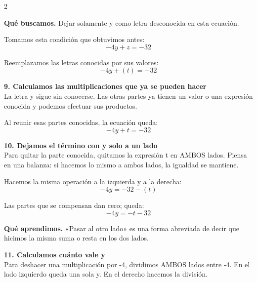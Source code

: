\documentclass[11pt,a4paper,landscape]{article}
\begin{document}
\begin{multicols*}{2}
\begin{minipage}{\linewidth}
\par\smallskip\textbf{Qué buscamos.} Dejar solamente y como letra desconocida en esta ecuación.
\par\smallskip Tomamos esta condición que obtuvimos antes:
\[-4y + z = -32\]
\par\smallskip Reemplazamos las letras conocidas por sus valores:
\[-4y + \left(t\right)=-32\]
\end{minipage}\par\medskip
\noindent\begin{minipage}{\linewidth}\textbf{9. Calculamos las multiplicaciones que ya se pueden hacer}\\[2pt]La letra y sigue sin conocerse. Las otras partes ya tienen un valor o una expresión conocida y podemos efectuar sus productos.
\par{}\par\smallskip
\par\smallskip Al reunir esas partes conocidas, la ecuación queda:
\[-4y + t=-32\]
\end{minipage}\par\medskip
\noindent\begin{minipage}{\linewidth}\textbf{10. Dejamos el término con y solo a un lado}\\[2pt]Para quitar la parte conocida, quitamos la expresión t en AMBOS lados. Piensa en una balanza: si hacemos lo mismo a ambos lados, la igualdad se mantiene.
\par\smallskip Hacemos la misma operación a la izquierda y a la derecha:
\[-4y=-32-\left(t\right)\]
\par\smallskip Las partes que se compensan dan cero; queda:
\[-4y=- t - 32\]
\par\smallskip\textbf{Qué aprendimos.} «Pasar al otro lado» es una forma abreviada de decir que hicimos la misma suma o resta en los dos lados.
\end{minipage}\par\medskip
\noindent\begin{minipage}{\linewidth}\textbf{11. Calculamos cuánto vale y}\\[2pt]Para deshacer una multiplicación por -4, dividimos AMBOS lados entre -4. En el lado izquierdo queda una sola y. En el derecho hacemos la división.

\end{minipage}
\end{multicols*}
\end{document}
